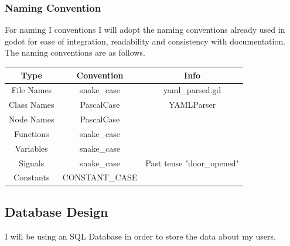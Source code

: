 \documentclass{article}
\begin{document}
        \subsubsection{Naming Convention}
        For naming I conventions I will adopt the naming conventions already used in godot for ease of integration, readability and consistency with documentation.\\
        The naming conventions are as follows.\\
        \begin{tabular}{|c|c|c|}
                \hline
                Type&Convention&Info\\
                \hline
                File Names&snake\_case&yaml\_parsed.gd\\
                \hline
                Class Names&PascalCase&YAMLParser\\
                \hline
                Node Names&PascalCase&\\
                \hline
                Functions&snake\_case&\\
                \hline
                Variables&snake\_case&\\
                \hline
                Signals&snake\_case& Past tense "door\_opened"\\
                \hline
                Constants&CONSTANT\_CASE&\\
                \hline
        \end{tabular}
        \newpage
        \subsection{Database Design}
        I will be using an SQL Database in order to store the data about my users.\\
\end{document}
